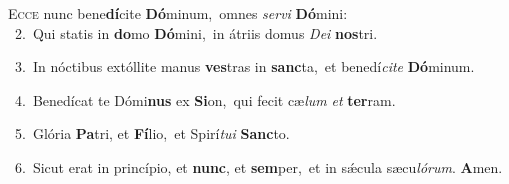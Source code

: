 \lettrine{\initial\textcolor{\initialcolor}{E}}{cce} nunc bene\-\textbf{dí}\-cite \textbf{Dó}\-minum,~\star omnes \textit{ser}\-\textit{vi} \textbf{Dó}\-mini:\\
{\numbfont\textcolor{\numbcolor}{~2.}}~Qui statis in \textbf{do}\-mo \textbf{Dó}\-mini,~\star in átriis domus \textit{De}\-\textit{i} \textbf{nos}\-tri.\par
{\numbfont\textcolor{\numbcolor}{~3.}}~In nóctibus extóllite manus \textbf{ves}\-tras in \textbf{sanc}\-ta,~\star et benedí\-\textit{ci}\-\textit{te} \textbf{Dó}\-minum.\par
{\numbfont\textcolor{\numbcolor}{~4.}}~Benedícat te Dómi\textbf{nus} ex \textbf{Si}\-on,~\star qui fecit cæ\textit{lum} \textit{et} \textbf{ter}\-ram.\par
{\numbfont\textcolor{\numbcolor}{~5.}}~Glória \textbf{Pa}\-tri, et \textbf{Fí}\-lio,~\star et Spirí\-\textit{tu}\-\textit{i} \textbf{Sanc}\-to.\par
{\numbfont\textcolor{\numbcolor}{~6.}}~Sicut erat in princípio, et \textbf{nunc}\-, et \textbf{sem}\-per,~\star et in sǽcula sæcu\-\textit{ló}\-\textit{rum}. \textbf{A}\-men.\par

